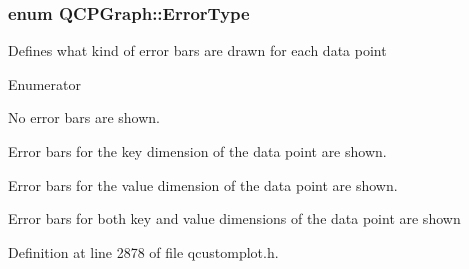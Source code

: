 \subsubsection[{Error\+Type}]{\setlength{\rightskip}{0pt plus 5cm}enum {\bf Q\+C\+P\+Graph\+::\+Error\+Type}}\label{class_q_c_p_graph_ad23b514404bd2cb3216f57c90904d6af}
Defines what kind of error bars are drawn for each data point \begin{Desc}
\item[Enumerator]\par
\begin{description}
\item[{\em 
\hypertarget{class_q_c_p_graph_ad23b514404bd2cb3216f57c90904d6afaeae745e7cc1766bb8546e35d4b76a711}{}et\+None\label{class_q_c_p_graph_ad23b514404bd2cb3216f57c90904d6afaeae745e7cc1766bb8546e35d4b76a711}
}]No error bars are shown. \item[{\em 
\hypertarget{class_q_c_p_graph_ad23b514404bd2cb3216f57c90904d6afa2a5d89cd76fb8b6b18d71b8f6f6c0f43}{}et\+Key\label{class_q_c_p_graph_ad23b514404bd2cb3216f57c90904d6afa2a5d89cd76fb8b6b18d71b8f6f6c0f43}
}]Error bars for the key dimension of the data point are shown. \item[{\em 
\hypertarget{class_q_c_p_graph_ad23b514404bd2cb3216f57c90904d6afa147022ccdc49f6bd48f904cb4f61872e}{}et\+Value\label{class_q_c_p_graph_ad23b514404bd2cb3216f57c90904d6afa147022ccdc49f6bd48f904cb4f61872e}
}]Error bars for the value dimension of the data point are shown. \item[{\em 
\hypertarget{class_q_c_p_graph_ad23b514404bd2cb3216f57c90904d6afa761cb7d61670c1e2efecccd8974409ab}{}et\+Both\label{class_q_c_p_graph_ad23b514404bd2cb3216f57c90904d6afa761cb7d61670c1e2efecccd8974409ab}
}]Error bars for both key and value dimensions of the data point are shown \end{description}
\end{Desc}


Definition at line 2878 of file qcustomplot.\+h.


